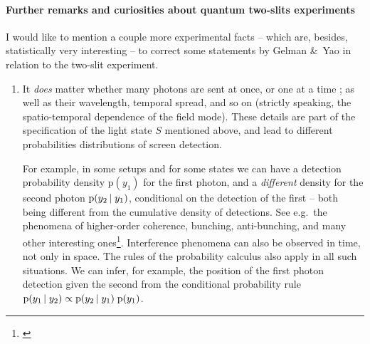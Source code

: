 \documentclass[\ifafour a4paper,12pt,\else a5paper,10pt,\fi%
onecolumn,oneside,article,%
british%
]{memoir}
\theoremstyle{remark}
\theoremstyle{innote}
\newcommand*{\citep}{\parencites}%
\newcommand*{\amp}{\&}
\newcommand*{\pf}{\mathrm{p}}%
\renewcommand*{\|}[1][]{\nonscript\,#1\vert\nonscript\;\mathopen{}}
\newcommand*{\sect}{\S}%
\newcommand*{\eg}{{e.g.}}
\newcommand*{\cf}{{cf.}}
\begin{document}
\bigskip

\paragraph{Further remarks and curiosities about quantum two-slits
  experiments}

I would like to mention a couple more experimental facts -- which are,
besides, statistically very interesting -- to correct some statements by
Gelman \amp\ Yao in relation to the two-slit experiment.

\begin{enumerate}[label=(\textbf{\roman*})]
\item\label{item:q_details} It \emph{does} matter whether many photons are
  sent at once, or one at a time \citep[\cf][\sect~2
  point~1]{gelmanetal2020}; as well as their wavelength, temporal spread,
  and so on (strictly speaking, the spatio-temporal dependence of the field
  mode). These details are part of the specification of the light state $S$
  mentioned above, and lead to different probabilities distributions of
  screen detection.

  For example, in some setups and for some states we can have a detection
  probability density $\pf(y_{1})$ for the first photon, and a
  \emph{different} density for the second photon $\pf(y_{2} \| y_{1})$,
  conditional on the detection of the first -- both being different from
  the cumulative density of detections. See \eg\ the phenomena of
  higher-order coherence, bunching, anti-bunching, and many other
  interesting ones\footnote{\label{fn:ref_interf}\cites[for
    example][]{mandeletal1965,morganetal1966,paul1982,jacobsonetal1995}[and
    textbooks such
    as][]{loudon1973_r2000,mandeletal1995_r2008,scullyetal1997_r2001,bachoretal1998_r2004,wallsetal1994}}.
  Interference phenomena can also be observed in time, not only in space.
  The rules of the probability calculus also apply in all such situations.
  We can infer, for example, the position of the first photon detection
  given the second from the conditional probability rule
  $\pf(y_{1} \| y_{2}) \propto \pf(y_{2} \| y_{1})\;\pf(y_{1})$.
  


\end{enumerate}
\end{document}
